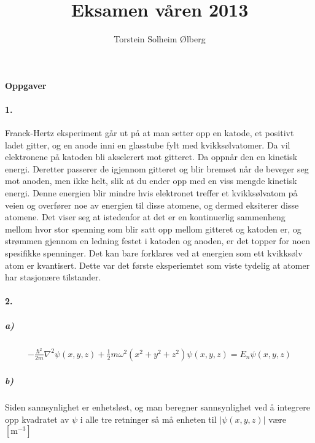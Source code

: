 \documentclass[11pt, A4paper,norsk]{article}
\author{Torstein Solheim Ølberg}
\title{Eksamen våren 2013}
\begin{document}
\maketitle
	\begin{center}
\Large \textbf{Oppgaver}
	\end{center}









		\paragraph{1.}
			\begin{flushleft}
Franck-Hertz eksperiment går ut på at man setter opp en katode, et positivt ladet gitter, og en anode inni en glasstube fylt med kvikksølvatomer. Da vil elektronene på katoden bli akselerert mot gitteret. Da oppnår den en kinetisk energi. Deretter passerer de igjennom gitteret og blir bremset når de beveger seg mot anoden, men ikke helt, slik at du ender opp med en viss mengde kinetisk energi. Denne energien blir mindre hvis elektronet treffer et kvikksølvatom på veien og overfører noe av energien til disse atomene, og dermed eksiterer disse atomene. Det viser seg at istedenfor at det er en kontinuerlig sammenheng mellom hvor stor spenning som blir satt opp mellom gitteret og katoden er, og strømmen gjennom en ledning festet i katoden og anoden, er det topper for noen spesifikke spenninger. Det kan bare forklares ved at energien som ett kvikksølv atom er kvantisert. Dette var det første eksperiemtet som viste tydelig at atomer har stasjonære tilstander.
			\end{flushleft}








		\paragraph{2.}
			\subparagraph{a)}
				\begin{gather*}
- \frac{\hbar^2}{2 m} \nabla^2 \psi(x, y, z) + \frac{1}{2} m \omega^2(x^2 + y^2 + z^2) \psi(x, y, z) = E_n \psi(x, y, z)
				\end{gather*}









			\subparagraph{b)}
				\begin{flushleft}
Siden sannsynlighet er enhetsløst, og man beregner sannsynlighet ved å integrere opp kvadratet av $\psi$ i alle tre retninger så må enheten til $|\psi(x, y, z)|$ være $[\text{m}^{-3}]$
				\end{flushleft}
\end{document}
